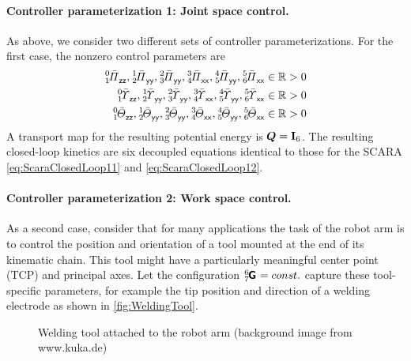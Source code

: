 \paragraph{Controller parameterization 1: Joint space control.}
As above, we consider two different sets of controller parameterizations.
For the first case, the nonzero control parameters are
\begin{align}
 \bodyMOSCoeffC{0}{1}{\idxZ\idxZ}, \bodyMOSCoeffC{1}{2}{\idxY\idxY}, \bodyMOSCoeffC{2}{3}{\idxY\idxY}, \bodyMOSCoeffC{3}{4}{\idxX\idxX}, \bodyMOSCoeffC{4}{5}{\idxY\idxY}, \bodyMOSCoeffC{5}{6}{\idxX\idxX} &\in \RealNum > 0
\nonumber\\
 \bodyMODCoeffC{0}{1}{\idxZ\idxZ}, \bodyMODCoeffC{1}{2}{\idxY\idxY}, \bodyMODCoeffC{2}{3}{\idxY\idxY}, \bodyMODCoeffC{3}{4}{\idxX\idxX}, \bodyMODCoeffC{4}{5}{\idxY\idxY}, \bodyMODCoeffC{5}{6}{\idxX\idxX} &\in \RealNum > 0
\nonumber\\
 \bodyMOICoeffC{0}{1}{\idxZ\idxZ}, \bodyMOICoeffC{1}{2}{\idxY\idxY}, \bodyMOICoeffC{2}{3}{\idxY\idxY}, \bodyMOICoeffC{3}{4}{\idxX\idxX}, \bodyMOICoeffC{4}{5}{\idxY\idxY}, \bodyMOICoeffC{5}{6}{\idxX\idxX} &\in \RealNum > 0
\end{align}
A transport map for the resulting potential energy is $\sysTransportMap = \idMat[6]$.
The resulting closed-loop kinetics are six decoupled equations identical to those for the SCARA \eqref{eq:ScaraClosedLoop11} and \eqref{eq:ScaraClosedLoop12}.

\paragraph{Controller parameterization 2: Work space control.}
As a second case, consider that for many applications the task of the robot arm is to control the position and orientation of a tool mounted at the end of its kinematic chain.
This tool might have a particularly meaningful center point (TCP) and principal axes.
Let the configuration $\bodyHomoCoord{6}{7} = \const$ capture these tool-specific parameters, for example the tip position and direction of a welding electrode as shown in \autoref{fig:WeldingTool}.

\begin{figure}[ht]
 \centering
 
 \caption{Welding tool attached to the robot arm (background image from www.kuka.de)}
 \label{fig:WeldingTool}
\end{figure}


